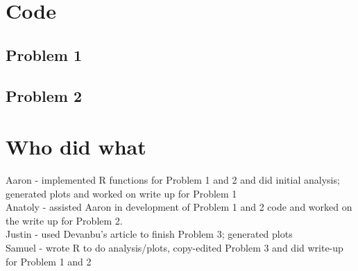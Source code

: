 \documentclass{article}
\begin{document}
\section{Code}
\subsection{Problem 1}

\subsection{Problem 2}


\section{Who did what}
Aaron - implemented R functions for Problem 1 and 2 and did initial analysis; generated plots and worked on write up for Problem 1 \\
Anatoly - assisted Aaron in development of Problem 1 and 2 code and worked on the write up for Problem 2. \\
Justin - used Devanbu's article to finish Problem 3; generated plots \\
Samuel - wrote R to do analysis/plots, copy-edited Problem 3 and did write-up for Problem 1 and 2
\end{document}
